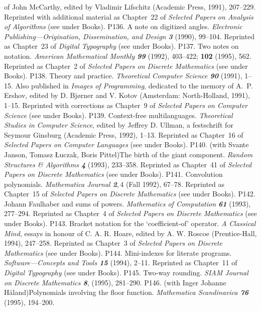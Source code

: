  of John McCarthy, edited by Vladimir Lifschitz
 (Academic Press, 1991), 207--229.
 Reprinted with additional material as Chapter~22 of {\sl Selected Papers
 on Analysis of Algorithms\/} (see under Books).
\p P136. A note on digitized angles. {\sl Electronic Publishing---Origination,
 Dissemination, and Design\/ \bf3} (1990), 99--104.
 Reprinted as Chapter~23 of {\sl Digital Typography\/} (see under Books).
\p P137. Two notes on notation. {\sl American Mathematical
 Monthly\/ \bf99} (1992), 403--422; {\bf 102} (1995), 562.
 Reprinted as Chapter~2 of {\sl Selected Papers on
 Discrete Mathematics\/} (see under Books).
\p P138. Theory and practice. {\sl Theoretical Computer Science\/ \bf90}
 (1991), 1--15. Also published in {\sl Images of Programming}, dedicated to
 the memory of A.~P. Ershov, edited by
 D. Bj\o rner and V. Kotov (Amsterdam: North-Holland, 1991), 1--15.
 Reprinted with corrections as Chapter~9 of {\sl Selected Papers on
 Computer Science\/} (see under Books).
\p P139. Context-free multilanguages. {\sl Theoretical
 Studies in Computer Science}, edited by Jeffrey D. Ullman, a festschrift
 for Seymour Ginsburg (Academic Press, 1992), 1--13.
 Reprinted as Chapter~16 of {\sl Selected Papers on
 Computer Languages\/} (see under Books).
\p P140. (with Svante Janson, Tomasz \L uczak, Boris Pittel)\xskip The birth
 of the giant component. {\sl Random Structures \& Algorithms\/ \bf4}
 (1993), 233--358.
 Reprinted as Chapter~41 of {\sl Selected Papers on
 Discrete Mathematics\/} (see under Books).
\p P141. Convolution polynomials. {\sl Mathematica Journal\/ \bf2},\,4 (Fall
 1992), 67--78.
 Reprinted as Chapter~15 of {\sl Selected Papers on
 Discrete Mathematics\/} (see under Books).
\p P142. Johann Faulhaber and sums of powers. {\sl Mathematics of
 Computation\/ \bf 61} (1993), 277--294.
 Reprinted as Chapter~4 of {\sl Selected Papers on
 Discrete Mathematics\/} (see under Books).
\p P143. Bracket notation for the `coefficient-of' operator. {\sl A
 Classical Mind}, essays in honour of C. A. R. Hoare, edited by A. W. Roscoe
 (Prentice-Hall, 1994), 247--258.
 Reprinted as Chapter~3 of {\sl Selected Papers on
 Discrete Mathematics\/} (see under Books).
\p P144. Mini-indexes for literate programs. {\sl Software---Concepts
 and Tools\/ \bf15} (1994), 2--11.
 Reprinted as Chapter~11 of {\sl Digital Typography\/} (see under Books).
\p P145. Two-way rounding. {\sl SIAM Journal on Discrete Mathematics\/ \bf8},
 (1995), 281--290.
\p P146. (with Inger Johanne H{\aa}land)\xskip Polynomials involving the floor
 function. {\sl Mathematica Scandinavica\/ \bf76} (1995), 194--200.
